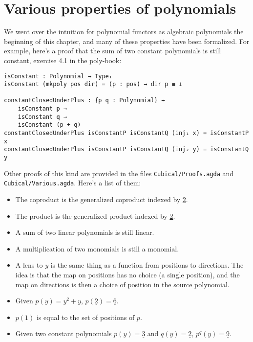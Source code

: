 \section{Various properties of polynomials}

We went over the intuition for polynomial functors as algebraic polynomials the beginning of this chapter, and many of these properties have been formalized. For example, here's a proof that the sum of two constant polynomials is still constant, exercise 4.1 in the poly-book:

\begin{verbatim}
isConstant : Polynomial → Type₁
isConstant (mkpoly pos dir) = (p : pos) → dir p ≡ ⊥

constantClosedUnderPlus : {p q : Polynomial} → 
    isConstant p → 
    isConstant q → 
    isConstant (p + q)
constantClosedUnderPlus isConstantP isConstantQ (inj₁ x) = isConstantP x
constantClosedUnderPlus isConstantP isConstantQ (inj₂ y) = isConstantQ y
\end{verbatim}

Other proofs of this kind are provided in the files \texttt{Cubical/Proofs.agda} and 
\texttt{Cubical/Various.agda}. Here's a list of them:
\begin{itemize}
    \item The coproduct is the generalized coproduct indexed by \underline{2}.
    \item The product is the generalized product indexed by \underline{2}.
    \item A sum of two linear polynomials is still linear.
    \item A multiplication of two monomials is still a monomial.
    \item A lens to $y$ is the same thing as a function from positions to directions. The idea is that the map on positions has no choice (a single position), and the map on directions is then a choice of position in the source polynomial.
    \item Given $p(y) = y^2 + y$, $p(\underline{2}) = \underline{6}$.
    \item $p(1)$ is equal to the set of positions of $p$.
    \item Given two constant polynomials $p(y) = \underline{3}$ and $q(y) = \underline{2}$, $p^q(y) = \underline{9}$.
\end{itemize}
